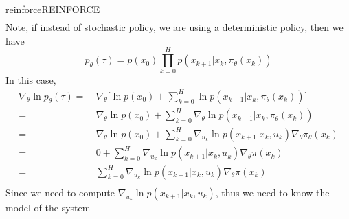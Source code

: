 \documentclass[9pt]{article}
\begin{document}
\begin{topic}{reinforce}{REINFORCE}
\[\begin{split}
\end{split}
\]
Note, if instead of stochastic policy, we are using a deterministic policy, then we have 
\[
p_{\theta}(\tau) = p(x_0) \prod_{k=0}^{H}p(x_{k+1}|x_k,\pi_{\theta}(x_k))
\]
In this case, 
\[
\begin{split}
\nabla_{\theta} \ln p_{\theta}(\tau) = &\ \nabla_{\theta} \big[ \ln p(x_0) + \sum_{k=0}^{H} \ln p(x_{k+1}|x_k,\pi_{\theta}(x_k))\big]\\
= &\ \nabla_{\theta} \ln p(x_0) + \sum_{k=0}^{H} \nabla_{\theta} \ln p(x_{k+1}|x_k,\pi_{\theta}(x_k))\\
= &\ \nabla_{\theta} \ln p(x_0) + \sum_{k=0}^{H} \nabla_{u_k} \ln p(x_{k+1}|x_k,u_k) \nabla_{\theta} \pi_{\theta}(x_k)\\
= &\ 0 +  \sum_{k=0}^{H} \nabla_{u_k} \ln p(x_{k+1}|x_k,u_k) \nabla_{\theta} \pi(x_k)\\
= &\ \sum_{k=0}^{H} \nabla_{u_k} \ln p(x_{k+1}|x_k,u_k) \nabla_{\theta} \pi(x_k)\\
\end{split}
\]
Since we need to compute $\nabla_{u_k} \ln p(x_{k+1}|x_k,u_k)$, thus we need to know the model of the system
\end{topic}
\end{document}

